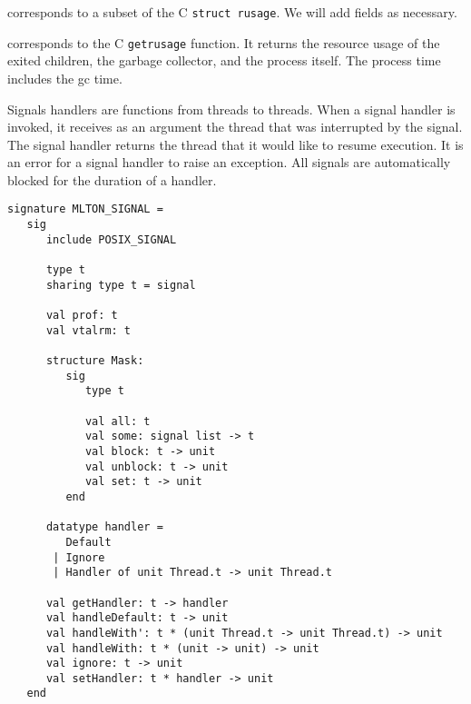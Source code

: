 \begin{description}
corresponds to a subset of the C {\tt struct rusage}.  We will add fields as
necessary.

corresponds to the C {\tt getrusage} function.  It returns the resource usage of
the exited children, the garbage collector, and the process itself.  The process
time includes the gc time.
\end{description}

Signals handlers are functions from threads to threads.  When a signal 
handler is invoked, it receives as an argument the thread that was
interrupted by the signal.  The signal handler returns the thread that 
it would like to resume execution.  It is an error for a signal
handler to raise an exception.  All signals are automatically blocked
for the duration of a handler.

\begin{verbatim}
signature MLTON_SIGNAL =
   sig
      include POSIX_SIGNAL

      type t
      sharing type t = signal

      val prof: t
      val vtalrm: t

      structure Mask:
         sig
            type t
               
            val all: t
            val some: signal list -> t
            val block: t -> unit
            val unblock: t -> unit
            val set: t -> unit
         end

      datatype handler =
         Default
       | Ignore
       | Handler of unit Thread.t -> unit Thread.t

      val getHandler: t -> handler
      val handleDefault: t -> unit
      val handleWith': t * (unit Thread.t -> unit Thread.t) -> unit
      val handleWith: t * (unit -> unit) -> unit
      val ignore: t -> unit
      val setHandler: t * handler -> unit
   end
\end{verbatim}

